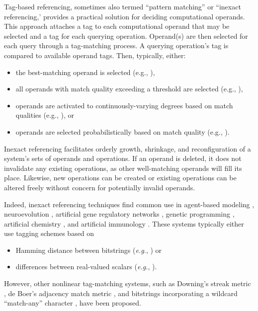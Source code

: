 Tag-based referencing, sometimes also termed ``pattern matching'' or ``inexact referencing,' provides a practical solution for deciding computational operands.
This approach attaches a tag to each computational operand that may be selected and a tag for each querying operation.
Operand(s) are then selected for each query through a tag-matching process.
A querying operation's tag is compared to available operand tags.
Then, typically, either:
\begin{itemize}
  \item the best-matching operand is selected (e.g., \cite{spector2012tag}),
  \item all operands with match quality exceeding a threshold are selected (e.g., \cite{riolo2001evolution}),
  \item operands are activated to continuously-varying degrees based on match qualities (e.g., \cite{banzhaf2003artificial}), or
  \item operands are selected probabilistically based on match quality (e.g., \cite{seiden1992simulation}).
\end{itemize}

Inexact referencing facilitates orderly growth, shrinkage, and reconfiguration of a system's sets of operands and operations.
If an operand is deleted, it does not invalidate any existing operations, as other well-matching operands will fill its place.
Likewise, new operations can be created or existing operations can be altered freely without concern for potentially invalid operands.

Indeed, inexact referencing techniques find common use in agent-based modeling \citep{riolo2001evolution}, neuroevolution \citep{reisinger2007acquiring}, artificial gene regulatory networks \citep{banzhaf2003artificial}, genetic programming \citep{spector2011tag, lalejini2018evolving}, artificial chemistry \citep{dittrich2001artificial}, and artificial immunology \citep{timmis2008theoretical}.
These systems typically either use tagging schemes based on
\begin{itemize}
    \item Hamming distance between bitstrings (\textit{e.g.}, \cite{lalejini2018evolving,banzhaf2003artificial}) or
    \item differences between real-valued scalars (\textit{e.g.}, \cite{riolo2001evolution,spector2011tag}).
\end{itemize}
However, other nonlinear tag-matching systems, such as Downing's streak metric \citep{downing2015intelligence}, de Boer's adjacency match metric \citep{DEBOER1991381}, and bitstrings incorporating a wildcard ``match-any'' character \citep{holland2012signals}, have been proposed.

